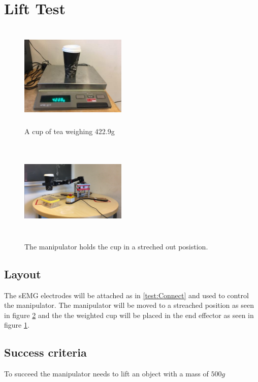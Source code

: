 \section{Lift Test} \label{sec:Lift}
\begin{multicols}{2}
\begin{figure}[H]
    \centering
    \includegraphics[width=0.45\textwidth, height=5cm]{Figures/Technical_figures/image3.jpg}
    \caption{A cup of tea weighing 422.9g}
    \label{fig:Tea}
\end{figure}
\columnbreak
\begin{figure}[H]
    \centering
    \includegraphics[width=0.45\textwidth,height=5cm]{Figures/Technical_figures/image4.png}
    \caption{The manipulator holds the cup in a streched out posistion.}
    \label{fig:stretch}
\end{figure}
\end{multicols}

\subsection*{Layout}
The sEMG electrodes will be attached as in \ref{test:Connect} and used to control the manipulator.
The manipulator will be moved to a streached position as seen in figure \ref{fig:stretch} and the the weighted cup will be placed in the end effector as seen in figure \ref{fig:Tea}. 
\subsection*{Success criteria}
To succeed the manipulator needs to lift an object with a mass of $500g$
